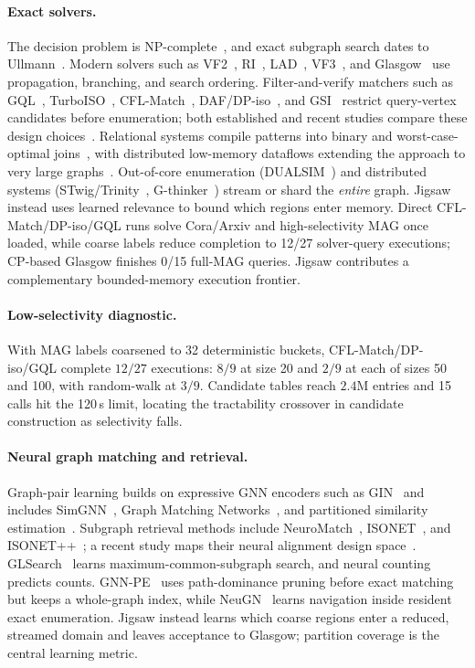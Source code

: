 \documentclass[runningheads]{llncs}
\begin{document}
\paragraph{Exact solvers.}
The decision problem is NP-complete~\cite{ref_garey}, and exact subgraph search dates to Ullmann~\cite{ref_ullmann}. Modern solvers such as VF2~\cite{ref_vf2}, RI~\cite{ref_ri}, LAD~\cite{ref_lad}, VF3~\cite{ref_vf3}, and Glasgow~\cite{ref_glasgow} use propagation, branching, and search ordering. Filter-and-verify matchers such as GQL~\cite{ref_graphql}, TurboISO~\cite{ref_turboiso}, CFL-Match~\cite{ref_cflmatch}, DAF/DP-iso~\cite{ref_daf}, and GSI~\cite{ref_gsi} restrict query-vertex candidates before enumeration; both established and recent studies compare these design choices~\cite{ref_survey,ref_survey2024}. Relational systems compile patterns into binary and worst-case-optimal joins~\cite{ref_wcoj}, with distributed low-memory dataflows extending the approach to very large graphs~\cite{ref_lowmem}. Out-of-core enumeration (DUALSIM~\cite{ref_dualsim}) and distributed systems (STwig/Trinity~\cite{ref_trinity}, G-thinker~\cite{ref_gthinker}) stream or shard the \emph{entire} graph. Jigsaw instead uses learned relevance to bound which regions enter memory. Direct CFL-Match/DP-iso/GQL runs solve Cora/Arxiv and high-selectivity MAG once loaded, while coarse labels reduce completion to 12/27 solver-query executions; CP-based Glasgow finishes 0/15 full-MAG queries. Jigsaw contributes a complementary bounded-memory execution frontier.

\paragraph{Low-selectivity diagnostic.} With MAG labels coarsened to 32 deterministic buckets, CFL-Match/DP-iso/GQL complete $12/27$ executions: $8/9$ at size 20 and $2/9$ at each of sizes 50 and 100, with random-walk at $3/9$. Candidate tables reach $2.4$M entries and 15 calls hit the 120\,s limit, locating the tractability crossover in candidate construction as selectivity falls.

\paragraph{Neural graph matching and retrieval.}
Graph-pair learning builds on expressive GNN encoders such as GIN~\cite{ref_gin} and includes SimGNN~\cite{ref_simgnn}, Graph Matching Networks~\cite{ref_gmn}, and partitioned similarity estimation~\cite{ref_psimgnn}. Subgraph retrieval methods include NeuroMatch~\cite{ref_neuromatch}, ISONET~\cite{ref_isonet}, and ISONET++~\cite{ref_isonetpp}; a recent study maps their neural alignment design space~\cite{ref_neuraldesign}. GLSearch~\cite{ref_glsearch} learns maximum-common-subgraph search, and neural counting~\cite{ref_nsic} predicts counts. GNN-PE~\cite{ref_gnnpe} uses path-dominance pruning before exact matching but keeps a whole-graph index, while NeuGN~\cite{ref_neugn} learns navigation inside resident exact enumeration. Jigsaw instead learns which coarse regions enter a reduced, streamed domain and leaves acceptance to Glasgow; partition coverage is the central learning metric.
\end{document}

